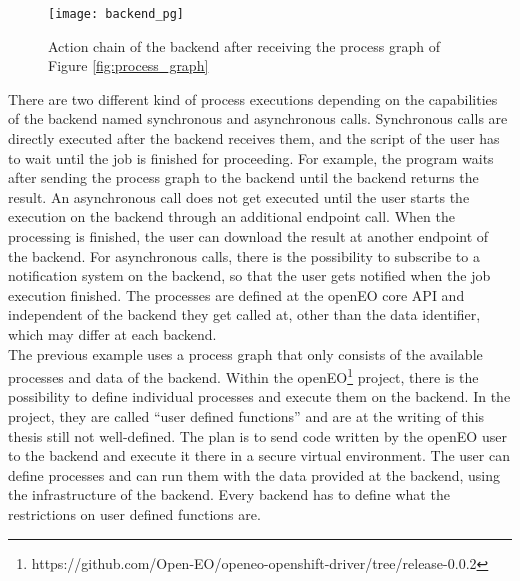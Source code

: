 \documentclass[draft,final]{vutinfth} %
\begin{document}
\begin{figure}[h]
	\centering
	\texttt{[image: backend\_pg]}
	\caption{Action chain of the backend after receiving the process graph of Figure \ref{fig:process_graph}}
	\label{fig:process_graph_diagram} %
\end{figure}

There are two different kind of process executions depending on the capabilities of the backend named synchronous and asynchronous calls. Synchronous calls are directly executed after the backend receives them, and the script of the user has to wait until the job is finished for proceeding. For example, the program waits after sending the process graph to the backend until the backend returns the result. An asynchronous call does not get executed until the user starts the execution on the backend through an additional endpoint call. When the processing is finished, the user can download the result at another endpoint of the backend. For asynchronous calls, there is the possibility to subscribe to a notification system on the backend, so that the user gets notified when the job execution finished.     
The processes are defined at the openEO core API and independent of the backend they get called at, other than the data identifier, which may differ at each backend.  
\\
The previous example uses a process graph that only consists of the available processes and data of the backend. Within the openEO\footnote{https://github.com/Open-EO/openeo-openshift-driver/tree/release-0.0.2} project, there is the possibility to define individual processes and execute them on the backend. In the project, they are called “user defined functions” and are at the writing of this thesis still not well-defined. The plan is to send code written by the openEO user to the backend and execute it there in a secure virtual environment. The user can define processes and can run them with the data provided at the backend, using the infrastructure of the backend. Every backend has to define what the restrictions on user defined functions are. 
\end{document}
